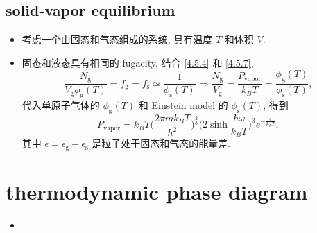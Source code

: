 \subsection{solid-vapor equilibrium}
\begin{itemize}
	\item 考虑一个由固态和气态组成的系统, 具有温度 $T$ 和体积 $V$.
	
	\item 固态和液态具有相同的 fugacity, 结合 \eqref{4.5.4} 和 \eqref{4.5.7},
	\begin{equation}
		\frac{N_\text{g}}{V_\text{g} \phi_\text{g}(T)} = f_\text{g} = f_\text{s} \simeq \frac{1}{\phi_\text{s}(T)} \Longrightarrow \frac{N_\text{g}}{V_\text{g}} = \frac{P_\text{vapor}}{k_B T} = \frac{\phi_\text{g}(T)}{\phi_\text{s}(T)},
	\end{equation}
	代入单原子气体的 $\phi_\text{g}(T)$ 和 Einstein model 的 $\phi_\text{s}(T)$, 得到
	\begin{equation}
		P_\text{vapor} = k_B T \Big( \frac{2 \pi m k_B T}{h^2} \Big)^{\frac{2}{3}} \Big( 2 \sinh \frac{\hbar \omega}{k_B T} \Big)^3 e^{- \frac{\epsilon}{k_B T}},
	\end{equation}
	其中 $\epsilon = \epsilon_\text{g} - \epsilon_\text{s}$ 是粒子处于固态和气态的能量差.
\end{itemize}

\section{thermodynamic phase diagram}
\begin{itemize}
	\item 
\end{itemize}
